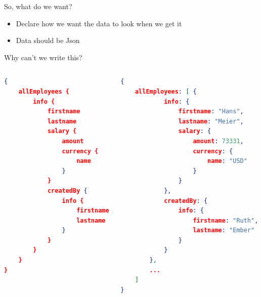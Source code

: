\documentclass[aspectratio=169,notes]{beamer}
\begin{document}
	\begin{frame}{So, what do we want?}
		\begin{itemize}
			\item Declare how we want the data to look when we get it
			\item Data should be Json
		\end{itemize}
	\end{frame}

	\begin{frame}[fragile]{Why can't we write this?}
		\vspace{-7mm}	
		\begin{columns}[t]
			\begin{column}{0.5\textwidth}
				\begin{lstlisting}[language=json,basicstyle=\scriptsize\ttfamily]
{
	allEmployees {
		info {
			firstname
			lastname
			salary {
				amount
				currency {
					name
				}
			}
			createdBy {
				info {
					firstname
					lastname
				}
			}
		}
	}
}
\end{lstlisting}	
			\end{column}
			\begin{column}{0.5\textwidth}
				\begin{lstlisting}[language=json,basicstyle=\scriptsize\ttfamily]
{
	allEmployees: [ { 
			info: {
				firstname: "Hans",
				lastname: "Meier",
				salary: {
					amount: 73331,
					currency: {
						name: "USD"
					}
				}
			},
			createdBy: {
				info: {
					firstname: "Ruth",
					lastname: "Ember"
				}
			}
		},
		...
	]
}
\end{lstlisting}	
			\end{column}
			
		\end{columns}
	\end{frame}
\end{document}
